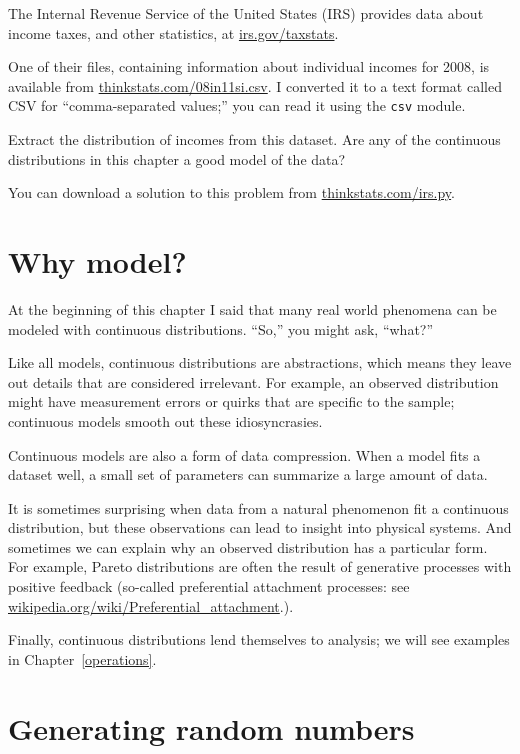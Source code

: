 \documentclass[12pt]{book}
\begin{document}
\begin{ex}
\label{irs}
The Internal Revenue Service of the United States (IRS) provides data
about income taxes, and other statistics, at \url{irs.gov/taxstats}.

One of their files, containing information about individual incomes
for 2008, is available from \url{thinkstats.com/08in11si.csv}. I
converted it to a text format called CSV for ``comma-separated values;''
you can read it using the {\tt csv} module.

Extract the distribution of incomes from this dataset.  Are any of
the continuous distributions in this chapter a good model of
the data?

You can download a solution to this problem from \url{thinkstats.com/irs.py}.

\end{ex}



\section{Why model?}

At the beginning of this chapter I said that many real world phenomena
can be modeled with continuous distributions.  ``So,'' you might ask,
``what?''

Like all models, continuous distributions are abstractions, which
means they leave out details that are considered irrelevant.
For example, an observed distribution might have measurement errors
or quirks that are specific to the sample; continuous models smooth
out these idiosyncrasies.

Continuous models are also a form of data compression.  When a model
fits a dataset well, a small set of parameters can summarize a
large amount of data.

It is sometimes surprising when data from a natural phenomenon fit a
continuous distribution, but these observations can lead to insight
into physical systems.  And sometimes we can explain why an observed
distribution has a particular form.  For example, Pareto distributions
are often the result of generative processes with positive feedback
(so-called preferential attachment processes: see
\url{wikipedia.org/wiki/Preferential_attachment}.).

Finally, continuous distributions lend themselves to analysis; we
will see examples in Chapter~\ref{operations}.


\section{Generating random numbers}
\end{document}
